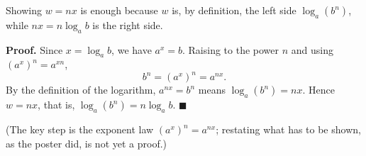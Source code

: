 Showing $w=nx$ is enough because $w$ is, by definition, the left side $\log_a\left(b^n\right)$, while $nx=n\log_ab$ is the right side.

\textbf{Proof.} Since $x=\log_ab$, we have $a^x=b$. Raising to the power $n$ and using $(a^x)^n=a^{xn}$,
\[b^n=\left(a^x\right)^n=a^{nx}.\]
By the definition of the logarithm, $a^{nx}=b^n$ means $\log_a\left(b^n\right)=nx$. Hence $w=nx$, that is, $\log_a\left(b^n\right)=n\log_ab$. $\blacksquare$

(The key step is the exponent law $(a^x)^n=a^{nx}$; restating what has to be shown, as the poster did, is not yet a proof.)
